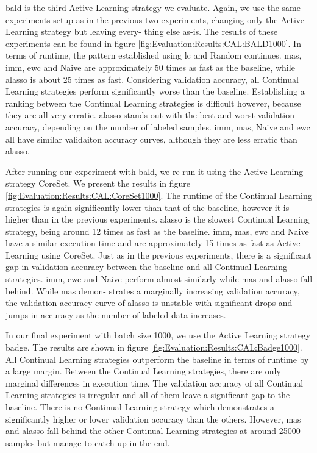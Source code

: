 \gls{bald} is the third Active Learning strategy we evaluate. Again, we use the same experiments setup as in the previous two experiments, changing only the Active Learning strategy but leaving every-
thing else as-is. The results of these experiments can be found in figure \ref{fig:Evaluation:Results:CAL:BALD1000}. In terms of runtime, the pattern established using \gls{lc} and Random continues.
\gls{mas}, \gls{imm}, \gls{ewc} and Naive are approximately 50 times as fast as the baseline, while \gls{alasso} is about 25 times as fast. Considering validation accuracy, all Continual Learning strategies perform significantly
worse than the baseline. Establishing a ranking between the Continual Learning strategies is difficult however, because they are all very erratic. \gls{alasso} stands out with the best and worst validation
accuracy, depending on the number of labeled samples. \gls{imm}, \gls{mas}, Naive and \gls{ewc} all have similar validaiton accuracy curves, although they are less erratic than \gls{alasso}. \par


After running our experiment with \gls{bald}, we re-run it using the Active Learning strategy CoreSet. We present the results in figure \ref{fig:Evaluation:Results:CAL:CoreSet1000}. The runtime of the 
Continual Learning strategies is again significantly lower than that of the baseline, however it is higher than in the previous experiments. \gls{alasso} is the slowest Continual Learning strategy, being
around 12 times as fast as the baseline. \gls{imm}, \gls{mas}, \gls{ewc} and Naive have a similar execution time and are approximately 15 times as fast as Active Learning using CoreSet. Just as in the previous experiments,
there is a significant gap in validation accuracy between the baseline and all Continual Learning strategies. \gls{imm}, \gls{ewc} and Naive perform almost similarly while \gls{mas} and \gls{alasso} fall behind. While \gls{mas} demon-
strates a marginally increasing validation accuracy, the validation accuracy curve of \gls{alasso} is unstable with significant drops and jumps in accuracy as the number of labeled data increases. \par


In our final experiment with batch size 1000, we use the Active Learning strategy \gls{badge}. The results are shown in figure \ref{fig:Evaluation:Results:CAL:Badge1000}. All Continual Learning strategies
outperform the baseline in terms of runtime by a large margin. Between the Continual Learning strategies, there are only marginal differences in execution time. The validation accuracy of all Continual
Learning strategies is irregular and all of them leave a significant gap to the baseline. There is no Continual Learning strategy which demonstrates a significantly higher or lower validation accuracy
than the others. However, \gls{mas} and \gls{alasso} fall behind the other Continual Learning strategies at around 25000 samples but manage to catch up in the end. \par


